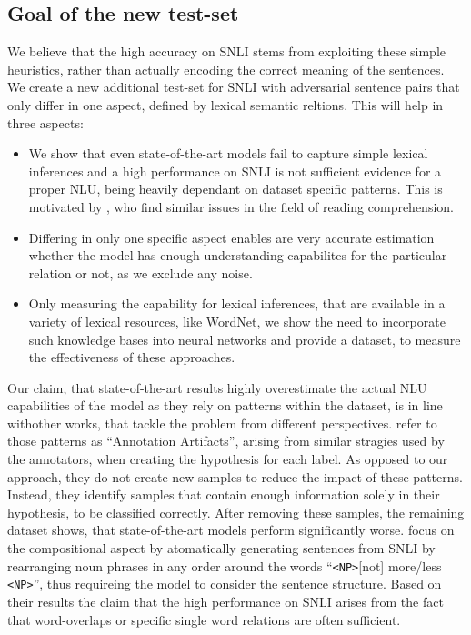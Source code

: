 \subsection{Goal of the new test-set}
We believe that the high accuracy on \ac{SNLI} stems from exploiting these simple heuristics, rather than actually encoding the correct meaning of the sentences. We create a new additional test-set \citep{glockner_acl18} for \ac{SNLI} with adversarial sentence pairs that only differ in one aspect, defined by lexical semantic reltions. This will help in three aspects:
\begin{itemize}
\item We show that even state-of-the-art models fail to capture simple lexical inferences and a high performance on \ac{SNLI} is not sufficient evidence for a proper \ac{NLU}, being heavily dependant on dataset specific patterns. This is motivated by \cite{jia-liang:2017:EMNLP2017}, who find similar issues in the field of reading comprehension.
\item Differing in only one specific aspect enables are very accurate estimation whether the model has enough understanding capabilites for the particular relation or not, as we exclude any noise.
\item Only measuring the capability for lexical inferences, that are available in a variety of lexical resources, like WordNet, we show the need to incorporate such knowledge bases into neural networks and provide a dataset, to measure the effectiveness of these approaches.
\end{itemize}
Our claim, that state-of-the-art results highly overestimate the actual \ac{NLU} capabilities of the model as they rely on patterns within the dataset, is in line withother works, that tackle the problem from different perspectives. \citep{gururangan2018annotation} refer to those patterns as ``Annotation Artifacts'', arising from similar stragies used by the annotators, when creating the hypothesis for each label. As opposed to our approach, they do not create new samples to reduce the impact of these patterns. Instead, they identify samples that contain enough information solely in their hypothesis, to be classified correctly. After removing these samples, the remaining dataset shows, that state-of-the-art models perform significantly worse. \citep{dasgupta2018evaluating} focus on the compositional aspect by atomatically generating sentences from \ac{SNLI} by rearranging noun phrases in any order around the words ``\texttt{<NP>}[not] more/less \texttt{<NP>}'', thus requireing the model to consider the sentence structure. Based on their results the claim that the high performance on \ac{SNLI} arises from the fact that word-overlaps or specific single word relations are often sufficient.



